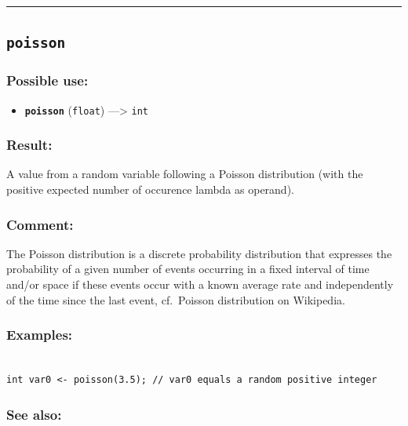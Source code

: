 \documentclass[]{book}
\providecommand{\tightlist}{%
  \setlength{\itemsep}{0pt}\setlength{\parskip}{0pt}}
\theoremstyle{definition}
\theoremstyle{definition}
\theoremstyle{definition}
\theoremstyle{remark}
\begin{document}
\begin{center}\rule{0.5\linewidth}{\linethickness}\end{center}

\subsection{\texorpdfstring{\texttt{poisson}}{poisson}}\label{poisson}

\subsubsection{Possible use:}\label{possible-use-412}

\begin{itemize}
\tightlist
\item
  \textbf{\texttt{poisson}} (\texttt{float}) ---\textgreater{}
  \texttt{int}
\end{itemize}

\subsubsection{Result:}\label{result-398}

A value from a random variable following a Poisson distribution (with
the positive expected number of occurence lambda as operand).

\subsubsection{Comment:}\label{comment-78}

The Poisson distribution is a discrete probability distribution that
expresses the probability of a given number of events occurring in a
fixed interval of time and/or space if these events occur with a known
average rate and independently of the time since the last event,
cf.~Poisson distribution on Wikipedia.

\subsubsection{Examples:}\label{examples-286}

\begin{verbatim}
 
int var0 <- poisson(3.5); // var0 equals a random positive integer
\end{verbatim}

\subsubsection{See also:}\label{see-also-165}
\end{document}
